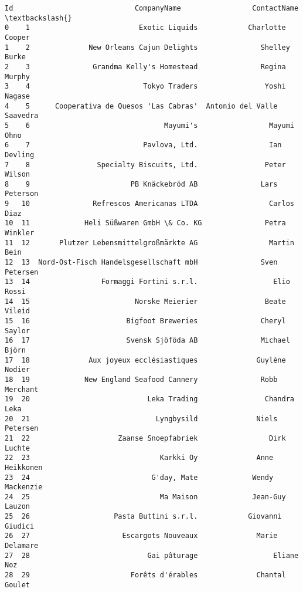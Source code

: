 \documentclass[11pt]{article}
\begin{document}
    \begin{Verbatim}[commandchars=\\\{\}]
    Id                             CompanyName                 ContactName  \textbackslash{}
0    1                          Exotic Liquids            Charlotte Cooper
1    2              New Orleans Cajun Delights               Shelley Burke
2    3               Grandma Kelly's Homestead               Regina Murphy
3    4                           Tokyo Traders                Yoshi Nagase
4    5      Cooperativa de Quesos 'Las Cabras'  Antonio del Valle Saavedra
5    6                                Mayumi's                 Mayumi Ohno
6    7                           Pavlova, Ltd.                 Ian Devling
7    8                Specialty Biscuits, Ltd.                Peter Wilson
8    9                        PB Knäckebröd AB               Lars Peterson
9   10               Refrescos Americanas LTDA                 Carlos Diaz
10  11             Heli Süßwaren GmbH \& Co. KG               Petra Winkler
11  12       Plutzer Lebensmittelgroßmärkte AG                 Martin Bein
12  13  Nord-Ost-Fisch Handelsgesellschaft mbH               Sven Petersen
13  14                 Formaggi Fortini s.r.l.                  Elio Rossi
14  15                         Norske Meierier                Beate Vileid
15  16                       Bigfoot Breweries               Cheryl Saylor
16  17                       Svensk Sjöföda AB               Michael Björn
17  18              Aux joyeux ecclésiastiques              Guylène Nodier
18  19             New England Seafood Cannery               Robb Merchant
19  20                            Leka Trading                Chandra Leka
20  21                              Lyngbysild              Niels Petersen
21  22                     Zaanse Snoepfabriek                 Dirk Luchte
22  23                               Karkki Oy              Anne Heikkonen
23  24                             G'day, Mate             Wendy Mackenzie
24  25                               Ma Maison             Jean-Guy Lauzon
25  26                    Pasta Buttini s.r.l.            Giovanni Giudici
26  27                      Escargots Nouveaux              Marie Delamare
27  28                            Gai pâturage                  Eliane Noz
28  29                        Forêts d'érables              Chantal Goulet


\end{Verbatim}
\end{document}
